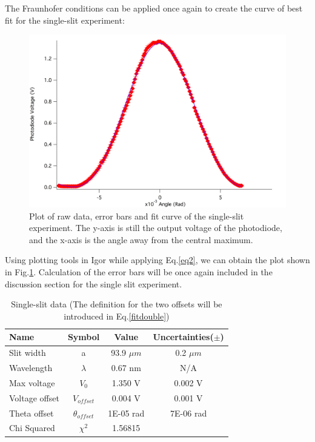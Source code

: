 \documentclass[prb,preprint]{revtex4-1}
\begin{document}
\newpage

The Fraunhofer conditions can be applied once again to create  the curve of best fit for the single-slit experiment: 

\begin{figure}[h]
\centering
\includegraphics[width=6.6in]{single.png}
\caption{Plot of raw data, error bars and fit curve of the single-slit experiment. The y-axis is still the output voltage of the photodiode, and the x-axis is the angle away from the central maximum.}
\label{single}
\end{figure}

Using plotting tools in Igor while applying Eq.\ref{eq2}, we can obtain the plot shown in Fig.\ref{single}. Calculation of the error bars will be once again included in the discussion section for the single slit experiment.

\begin{table}[h]
\centering
\caption{Single-slit data (The definition for the two offsets will be introduced in Eq.\ref{fitdouble})}
\begin{ruledtabular}
\begin{tabular}{ l c c c}
Name & Symbol & Value & Uncertainties($\pm$)\\
\hline
Slit width & a & 93.9 $\mu m$ & 0.2 $\mu m$\\
Wavelength & $\lambda$ & 0.67 nm & N/A \\
Max voltage & $V_0$ & 1.350 V & 0.002 V\\
Voltage offset & $V_{offset}$ &  0.004 V & 0.001 V\\
Theta offset &$ \theta_{offset}$ & 1E-05 rad & 7E-06 rad \\

\hline
Chi Squared & $\chi^2$ & 1.56815 &
\end{tabular}
\end{ruledtabular}
\label{data}
\end{table}
\end{document}
